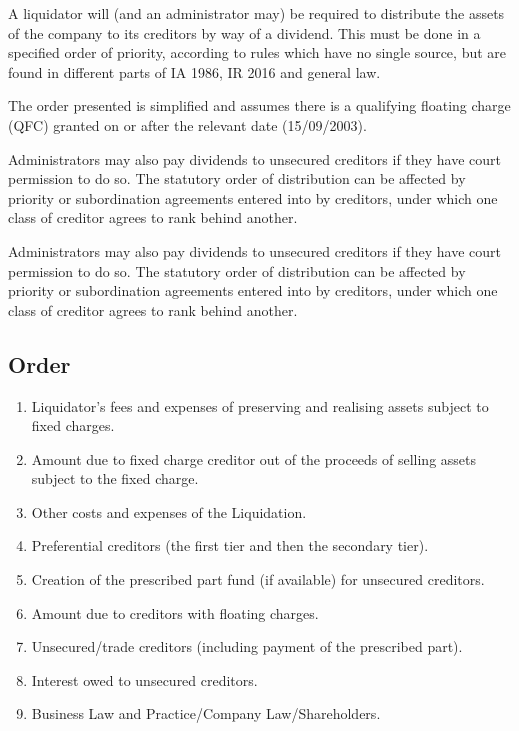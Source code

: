 \documentclass[
]{article}
\providecommand{\tightlist}{%
  \setlength{\itemsep}{0pt}\setlength{\parskip}{0pt}}
\begin{document}
A liquidator will (and an administrator may) be required to distribute
the assets of the company to its creditors by way of a dividend. This
must be done in a specified order of priority, according to rules which
have no single source, but are found in different parts of IA 1986, IR
2016 and general law.

The order presented is simplified and assumes there is a qualifying
floating charge (QFC) granted on or after the relevant date
(15/09/2003).

Administrators may also pay dividends to unsecured creditors if they
have court permission to do so. The statutory order of distribution can
be affected by priority or subordination agreements entered into by
creditors, under which one class of creditor agrees to rank behind
another.

Administrators may also pay dividends to unsecured creditors if they
have court permission to do so. The statutory order of distribution can
be affected by priority or subordination agreements entered into by
creditors, under which one class of creditor agrees to rank behind
another.

\hypertarget{order}{%
\subsection{Order}\label{order}}

\begin{enumerate}
\tightlist
\item
  Liquidator's fees and expenses of preserving and realising assets
  subject to fixed charges.
\item
  Amount due to fixed charge creditor out of the proceeds of selling
  assets subject to the fixed charge.
\item
  Other costs and expenses of the Liquidation.
\item
  Preferential creditors (the first tier and then the secondary tier).
\item
  Creation of the prescribed part fund (if available) for unsecured
  creditors.
\item
  Amount due to creditors with floating charges.
\item
  Unsecured/trade creditors (including payment of the prescribed part).
\item
  Interest owed to unsecured creditors.
\item
  Business Law and Practice/Company Law/Shareholders.
\end{enumerate}
\end{document}
